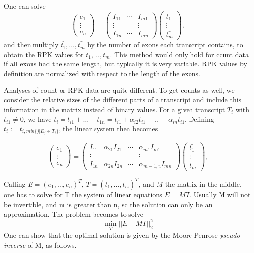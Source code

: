 \documentclass[a4paper,11pt]{article}
\begin{document}
One can solve
$$
\begin{pmatrix}
e_1 \\ \vdots \\ e_n
\end{pmatrix}
=
\begin{pmatrix}
I_{11} & \cdots & I_{m1} \\
\vdots &        & \vdots \\
I_{1n} & \cdots & I_{mn}
\end{pmatrix}
\begin{pmatrix}
\bar{t_1} \\ \vdots \\ \bar{t_m}
\end{pmatrix},
$$
and then multiply $\bar{t_1},\ldots,\bar{t_m}$ by the number of exons each transcript contains, to obtain the RPK values for $t_1,\ldots,t_m$. This method would only hold for count data if all exons had the same length, but typically it is very variable. RPK values by definition are normalized with respect to the length of the exons.

Analyses of count or RPK data are quite different. To get counts as well, we consider the relative sizes of the different parts of a transcript and include this information in the matrix instead of binary values. For a given transcript $T_i$ with $t_{i1} \neq 0$, we have $t_i = t_{i1} + \ldots + t_{1n} = t_{i1} + \alpha_{i2} t_{i1} + \ldots + \alpha_{in} t_{i1}$. Defining $\bar{t_i} := t_{i,min\{j|E_j\in T_i\}}$, the linear system then becomes 

$$
\begin{pmatrix}
e_1 \\ \vdots \\ e_n
\end{pmatrix}
=
\begin{pmatrix}
I_{11} & \alpha_{21}I_{21} &\cdots & \alpha_{m1}I_{m1} \\
\vdots &                   &       & \vdots \\
I_{1n} & \alpha_{2n}I_{2n} &\cdots & \alpha_{m-1,n}I_{mn}
\end{pmatrix}
\begin{pmatrix}
\bar{t_1} \\ \vdots \\ \bar{t_m}
\end{pmatrix},
$$

Calling $E = (e_1, \ldots, e_n)^T$, $T = (\bar{t_{1}},\ldots,\bar{t_{m}})^T$, and $M$ the matrix in the middle, one has to solve for T the system of linear equations $E = MT$. Usually M will not be invertible, and m is greater than n, so the solution can only be an approximation. The problem becomes to solve
$$ \min_T ||E-MT||_2^2 $$
One can show that the optimal solution is given by the Moore-Penrose \emph{pseudo-inverse} of M, as follows.
\end{document}
